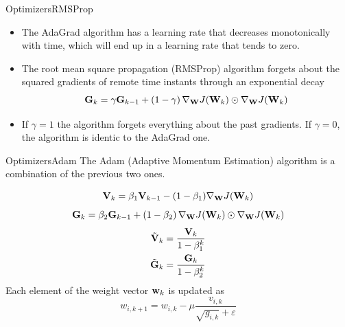\documentclass{beamer}
\begin{document}
\begin{frame}{Optimizers}{RMSProp}
\begin{itemize}
\item  The AdaGrad algorithm has a learning rate that decreases monotonically with time, which will end up in a learning rate that tends to zero. 

\item The root mean square propagation (RMSProp) algorithm forgets about the squared gradients of remote time instants through an exponential decay
\begin{equation}\label{eq:sq_grad_RMSProp}
    {\bf G}_k = \gamma {\bf G}_{k-1} + \left(1-\gamma\right) \nabla_{{\bf W}}J({\bf W}_{k}) \odot \nabla_{{\bf W}}J({\bf W}_{k})
\end{equation}
\item If $\gamma=1$ the algorithm forgets everything about the past gradients. If $\gamma=0$, the algorithm is identic to the AdaGrad one. 
\end{itemize}
\end{frame}

\begin{frame}{Optimizers}{Adam}
    The Adam (Adaptive Momentum Estimation) algorithm is a combination of the previous two ones. 

\begin{equation}
     {\bf V}_{k} = \beta_1{\bf V}_{k-1} - (1-\beta_1) \nabla_{{\bf W}} J({\bf W}_{k}) 
\end{equation}
\begin{equation}\label{eq:Adam_velocity} 
    {\bf G}_k = \beta_2 {\bf G}_{k-1} + \left(1-\beta_2\right) \nabla_{{\bf W}}J({\bf W}_{k}) \odot \nabla_{{\bf W}}J({\bf W}_{k})
\end{equation}
\begin{equation}\label{{eq:sq_grad_Adam}}
    \begin{split}
        \tilde{\bV}_k & = \frac{\bV_k}{1-\beta_1^{k}}\\
        \tilde{\bG}_k & = \frac{\bG_k}{1-\beta_2^{k}}\\
    \end{split}
\end{equation}
 Each element of the weight vector ${\bf w}_k$ is updated as 
\begin{equation}
    w_{i,k+1} = w_{i,k} -\mu \frac{v_{i,k}}{\sqrt{g_{i,k}}+\varepsilon} 
\end{equation}



\end{frame}
\end{document}
